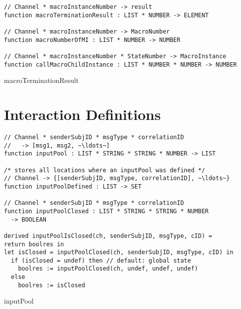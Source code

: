 \begin{listing}[H]
\begin{verbatim}
// Channel * macroInstanceNumber -> result
function macroTerminationResult : LIST * NUMBER -> ELEMENT

// Channel * macroInstanceNumber -> MacroNumber
function macroNumberOfMI : LIST * NUMBER -> NUMBER

// Channel * macroInstanceNumber * StateNumber -> MacroInstance
function callMacroChildInstance : LIST * NUMBER * NUMBER -> NUMBER
\end{verbatim}
\caption{macroTerminationResult}
\label{lst:asm:macroTerminationResult}
\end{listing}


\section{Interaction Definitions}

\begin{listing}[H]
\begin{verbatim}
// Channel * senderSubjID * msgType * correlationID
//   -> [msg1, msg2, ~\ldots~]
function inputPool : LIST * STRING * STRING * NUMBER -> LIST

/* stores all locations where an inputPool was defined */
// Channel -> {[senderSubjID, msgType, correlationID], ~\ldots~}
function inputPoolDefined : LIST -> SET

// Channel * senderSubjID * msgType * correlationID
function inputPoolClosed : LIST * STRING * STRING * NUMBER
  -> BOOLEAN

derived inputPoolIsClosed(ch, senderSubjID, msgType, cID) =
return boolres in
let isClosed = inputPoolClosed(ch, senderSubjID, msgType, cID) in
  if (isClosed = undef) then // default: global state
    boolres := inputPoolClosed(ch, undef, undef, undef)
  else
    boolres := isClosed
\end{verbatim}
\caption{inputPool}
\label{lst:asm:inputPool}
\end{listing}




